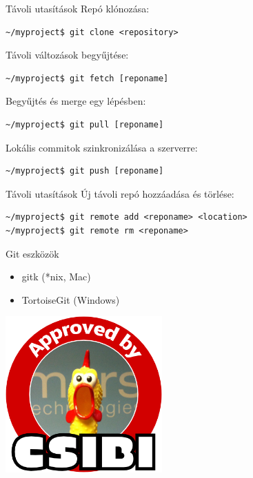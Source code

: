 \documentclass[display,t]{beamer}
\begin{document}
\begin{frame}[fragile]{Távoli utasítások}
    \pause
    Repó klónozása:
\small\begin{verbatim}
~/myproject$ git clone <repository>
\end{verbatim}\normalsize

    \pause
    Távoli változások begyűjtése:
\small\begin{verbatim}
~/myproject$ git fetch [reponame]
\end{verbatim}\normalsize

    \pause
    Begyűjtés és merge egy lépésben:
\small\begin{verbatim}
~/myproject$ git pull [reponame]
\end{verbatim}\normalsize

    \pause
    Lokális commitok szinkronizálása a szerverre:
\small\begin{verbatim}
~/myproject$ git push [reponame]
\end{verbatim}\normalsize
\end{frame}

\begin{frame}[fragile]{Távoli utasítások}
    \pause
    Új távoli repó hozzáadása és törlése:
\small\begin{verbatim}
~/myproject$ git remote add <reponame> <location>
~/myproject$ git remote rm <reponame>
\end{verbatim}\normalsize
\end{frame}

\begin{frame}{Git eszközök}
    \begin{itemize}
        \item gitk (*nix, Mac)
        \item TortoiseGit (Windows)
    \end{itemize}
\end{frame}

\begin{frame}
    \begin{center}
        \includegraphics[width=6cm]{approved_by_csibi.png}
    \end{center}
\end{frame}
\end{document}
